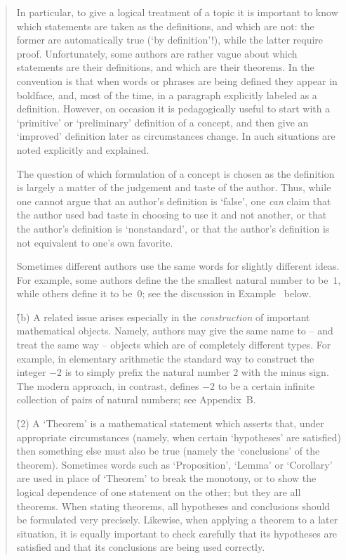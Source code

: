 \begin{quotation}
{         In particular, to give a logical treatment of a topic it is important to know which statements are taken as the definitions, and which are not:
    the former are automatically true (`by definition'!), while the latter require proof.
    Unfortunately, some authors are rather vague about which statements are their definitions, and which are their theorems.
    In {\TheseNotes} the convention is that when words or phrases are being defined they appear in boldface,
    and, most of the time, in a paragraph explicitly labeled as a definition.
    However, on occasion it is pedagogically useful to start with a `primitive' or `preliminary' definition of a concept,
    and then give an `improved' definition later as circumstances change. In {\TheseNotes} auch situations are noted explicitly and explained.

        The question of which formulation of a concept is chosen as the definition is largely a matter of the judgement and taste of the author.
    Thus, while one cannot argue that an author's definition is `false', one {\em can} claim that the author used bad taste in choosing to use it and not another,
    or that the author's definition is `nonstandard', or that the author's definition is not equivalent to one's own favorite.

        Sometimes different authors use the same words for slightly different ideas.
    For example, some authors define the the smallest natural number to be~$1$, while others define it to be~$0$;
    see the discussion in Example~ below.


\VA

      \h \h  (b) A related issue arises especially in the {\em construction} of important mathematical objects.
    Namely, authors may give the same name to -- and treat the same way --  objects which are of completely different types.
    For example, in elementary arithmetic the standard way to construct the integer $-2$ is to simply prefix the natural number $2$ with the minus sign.
    The modern approach, in contrast, defines $-2$ to be a certain infinite collection of pairs of natural numbers; see Appendix~B.


\V

      \h  (2) A `Theorem' is a mathematical statement which asserts that, under appropriate circumstances (namely, when certain `hypotheses' are satisfied)
    then something else must also be true (namely the `conclusions' of the theorem).
    Sometimes words such as `Proposition', `Lemma' or `Corollary' are used in place of `Theorem' to break the monotony,
    or to show the logical dependence of one statement on the other; but they are all theorems.
    When stating theorems, all hypotheses and conclusions should be formulated very precisely.
    Likewise, when applying a theorem to a later situation, it is equally important
    to check carefully that its hypotheses are satisfied and that its conclusions are being used correctly.

}
\end{quotation}
